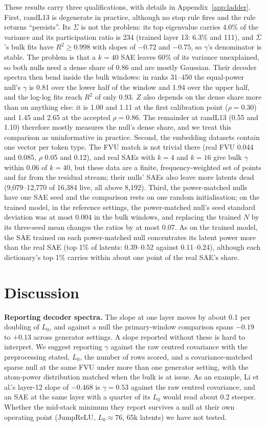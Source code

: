 \documentclass[10pt,twocolumn]{article}
\newcommand{\Sig}{\Sigma}
\newcommand{\Lz}{L_0}
\begin{document}
These results carry three qualifications, with details in Appendix~\ref{app:ladder}. First, randL13 is degenerate in practice, although no stop rule fires and the rule returns ``persists''. Its $\Sig$ is not the problem: its top eigenvalue carries 4.0\% of the variance and its participation ratio is 234 (trained layer 13: 6.3\% and 111), and $\Sig$'s bulk fits have $R^2\ge 0.998$ with slopes of $-0.72$ and $-0.75$, so $\gamma$'s denominator is stable. The problem is that a $k=40$ SAE leaves 60\% of its variance unexplained, so both nulls need a dense share of 0.86 and are mostly Gaussian. Their decoder spectra then bend inside the bulk windows: in ranks 31--450 the equal-power null's $\gamma$ is 0.81 over the lower half of the window and 1.94 over the upper half, and the log-log fits reach $R^2$ of only 0.93. $Z$ also depends on the dense share more than on anything else: it is 1.00 and 1.11 at the first calibration point ($\rho=0.30$) and 1.45 and 2.65 at the accepted $\rho=0.86$. The remainder at randL13 (0.55 and 1.10) therefore mostly measures the null's dense share, and we treat this comparison as uninformative in practice. Second, the embedding datasets contain one vector per token type. The FVU match is not trivial there (real FVU 0.044 and 0.085, $\rho$ 0.05 and 0.12), and real SAEs with $k=4$ and $k=16$ give bulk $\gamma$ within 0.06 of $k=40$, but these data are a finite, frequency-weighted set of points and far from the residual stream; their nulls' SAEs also leave more latents dead (9,079--12,770 of 16,384 live, all above 8,192). Third, the power-matched nulls have one SAE seed and the comparison rests on one random initialisation; on the trained model, in the reference settings, the power-matched null's seed standard deviation was at most 0.004 in the bulk windows, and replacing the trained $N$ by its three-seed mean changes the ratios by at most 0.07. As on the trained model, the SAE trained on each power-matched null concentrates its latent power more than the real SAE (top 1\% of latents: 0.39--0.52 against 0.11--0.24), although each dictionary's top 1\% carries within about one point of the real SAE's share.

\section{Discussion}
\label{sec:disc}

\textbf{Reporting decoder spectra.} The slope at one layer moves by about 0.1 per doubling of $\Lz$, and against a null the primary-window comparison spans $-0.19$ to $+0.13$ across generator settings. A slope reported without these is hard to interpret. We suggest reporting $\gamma$ against the raw centred covariance with the preprocessing stated, $\Lz$, the number of rows scored, and a covariance-matched sparse null at the same FVU under more than one generator setting, with the atom-power distribution matched when the bulk is at issue. As an example, Li et al.'s layer-12 slope of $-0.468$ is $\gamma=0.53$ against the raw centred covariance, and an SAE at the same layer with a quarter of its $\Lz$ would read about 0.2 steeper. Whether the mid-stack minimum they report survives a null at their own operating point (JumpReLU, $\Lz\approx 76$, 65k latents) we have not tested.
\end{document}
